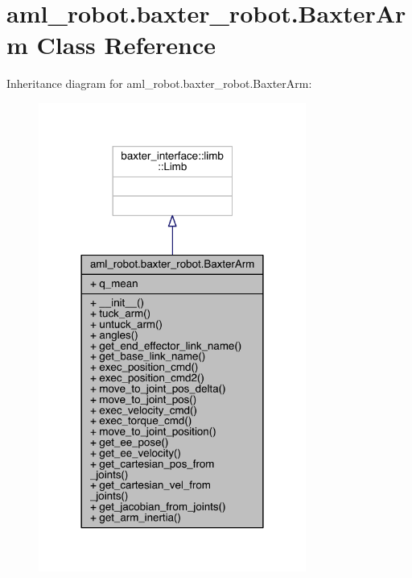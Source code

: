 \hypertarget{classaml__robot_1_1baxter__robot_1_1_baxter_arm}{}\section{aml\+\_\+robot.\+baxter\+\_\+robot.\+Baxter\+Arm Class Reference}
\label{classaml__robot_1_1baxter__robot_1_1_baxter_arm}


Inheritance diagram for aml\+\_\+robot.\+baxter\+\_\+robot.\+Baxter\+Arm\+:
\nopagebreak
\begin{figure}[H]
\begin{center}
\leavevmode
\includegraphics[width=249pt]{classaml__robot_1_1baxter__robot_1_1_baxter_arm__inherit__graph}
\end{center}
\end{figure}


